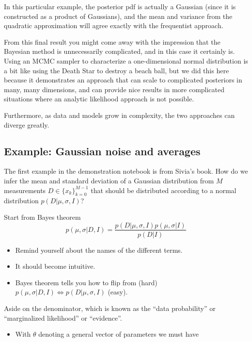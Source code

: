 \documentclass[%
oneside,                 %
final,                   %
10pt]{article}
\begin{document}
In this particular example, the posterior pdf is actually a Gaussian (since it is constructed as a product of Gaussians), and the mean and variance from the quadratic approximation will agree exactly with the frequentist approach.

From this final result you might come away with the impression that the Bayesian method is unnecessarily complicated, and in this case it certainly is. Using an MCMC sampler to characterize a one-dimensional normal distribution is a bit like using the Death Star to destroy a beach ball, but we did this here because it demonstrates an approach that can scale to complicated posteriors in many, many dimensions, and can provide nice results in more complicated situations where an analytic likelihood approach is not possible.

Furthermore, as data and models grow in complexity, the two approaches can diverge greatly. 



\subsection{Example: Gaussian noise and averages}
The first example in the demonstration notebook is from Sivia's book. How do we infer the mean and standard deviation of a Gaussian distribution from $M$ measurements $D \in \{ x_k \}_{k=0}^{M-1}$ that should be distributed according to a normal distribution $p( D | \mu,\sigma,I)$?

Start from Bayes theorem
\[
p(\mu,\sigma | D, I) = \frac{p(D|\mu,\sigma,I) p(\mu,\sigma|I)}{p(D|I)}
\]
\begin{itemize}
\item Remind yourself about the names of the different terms.

\item It should become intuitive.

\item Bayes theorem tells you how to flip from (hard) $p(\mu,\sigma | D, I) \Leftrightarrow p(D|\mu,\sigma,I)$ (easy).
\end{itemize}

\noindent
Aside on the denominator, which is known as the ``data probability'' or ``marginalized likelihood'' or ``evidence''. 
\begin{itemize}
\item With $\theta$ denoting a general vector of parameters we must have
\end{itemize}
\end{document}
